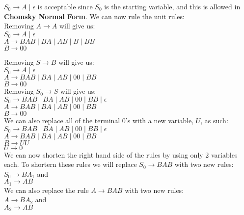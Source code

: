 \documentclass[12pt]{article}
\begin{document}
$S_0 \rightarrow A \; | \; \epsilon$ is acceptable since $S_0$ is the starting variable,
and this is allowed in \textbf{Chomsky Normal Form}. We can now rule the unit rules: \\

Removing $A \rightarrow A$ will give us: \\
$S_0 \rightarrow A \; | \; \epsilon$ \\
$A \rightarrow BAB \; | \; BA \; | \; AB \; | \; B \; | \; BB $ \\
$B \rightarrow 00 $ \\

\pagebreak

Removing $S \rightarrow B$ will give us: \\
$S_0 \rightarrow A \; | \; \epsilon$ \\
$A \rightarrow BAB \; | \; BA \; | \; AB \; | \; 00 \; | \; BB $ \\
$B \rightarrow 00 $ \\

Removing $S_0 \rightarrow S$ will give us: \\
$S_0 \rightarrow BAB \; | \; BA \; | \; AB \; | \; 00 \; | \; BB \; | \; \epsilon$ \\
$A \rightarrow BAB \; | \; BA \; | \; AB \; | \; 00 \; | \; BB $ \\
$B \rightarrow 00 $ \\

We can also replace all of the terminal 0's with a new variable, $U$, as such:
$S_0 \rightarrow BAB \; | \; BA \; | \; AB \; | \; 00 \; | \; BB \; | \; \epsilon$ \\
$A \rightarrow BAB \; | \; BA \; | \; AB \; | \; 00 \; | \; BB $ \\
$B \rightarrow UU $ \\
$U \rightarrow 0$ \\

We can now shorten the right hand side of the rules by using only 2 variables each.
To shortern these rules we will replace $S_0 \rightarrow BAB$ with two new rules: \\
$S_0 \rightarrow BA_1$ and \\
$A_1 \rightarrow AB$ \\

We can also replace the rule $A \rightarrow BAB$ with two new rules: \\
$A \rightarrow BA_2$ and \\
$A_2 \rightarrow AB$ \\
\end{document}
